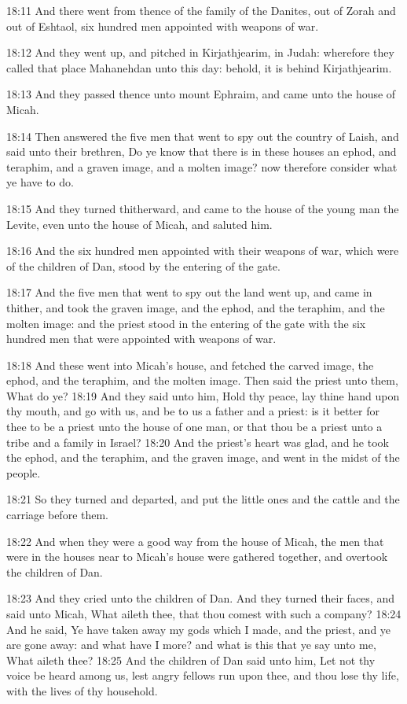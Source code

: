 18:11 And there went from thence of the family of the Danites, out of Zorah and out of Eshtaol, six hundred men appointed with weapons of war.

18:12 And they went up, and pitched in Kirjathjearim, in Judah: wherefore they called that place Mahanehdan unto this day: behold, it is behind Kirjathjearim.

18:13 And they passed thence unto mount Ephraim, and came unto the house of Micah.

18:14 Then answered the five men that went to spy out the country of Laish, and said unto their brethren, Do ye know that there is in these houses an ephod, and teraphim, and a graven image, and a molten image?  now therefore consider what ye have to do.

18:15 And they turned thitherward, and came to the house of the young man the Levite, even unto the house of Micah, and saluted him.

18:16 And the six hundred men appointed with their weapons of war, which were of the children of Dan, stood by the entering of the gate.

18:17 And the five men that went to spy out the land went up, and came in thither, and took the graven image, and the ephod, and the teraphim, and the molten image: and the priest stood in the entering of the gate with the six hundred men that were appointed with weapons of war.

18:18 And these went into Micah's house, and fetched the carved image, the ephod, and the teraphim, and the molten image. Then said the priest unto them, What do ye?  18:19 And they said unto him, Hold thy peace, lay thine hand upon thy mouth, and go with us, and be to us a father and a priest: is it better for thee to be a priest unto the house of one man, or that thou be a priest unto a tribe and a family in Israel?  18:20 And the priest's heart was glad, and he took the ephod, and the teraphim, and the graven image, and went in the midst of the people.

18:21 So they turned and departed, and put the little ones and the cattle and the carriage before them.

18:22 And when they were a good way from the house of Micah, the men that were in the houses near to Micah's house were gathered together, and overtook the children of Dan.

18:23 And they cried unto the children of Dan. And they turned their faces, and said unto Micah, What aileth thee, that thou comest with such a company?  18:24 And he said, Ye have taken away my gods which I made, and the priest, and ye are gone away: and what have I more? and what is this that ye say unto me, What aileth thee?  18:25 And the children of Dan said unto him, Let not thy voice be heard among us, lest angry fellows run upon thee, and thou lose thy life, with the lives of thy household.

